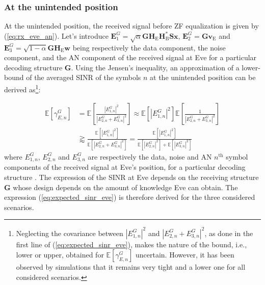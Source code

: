 \documentclass[journal,comsoc]{IEEEtran}
\newcommand{\EX}[1]{\mathbb{E} \left[#1\right]}%
\newcommand{\HE}{\textbf{H}_{\text{E}}}
\newcommand{\HB}{\textbf{H}_{\text{B}}}
\newcommand{\spread}{\textbf{S}}
\newcommand{\w}{\textbf{w}}
\newcommand{\mat}[1]{\boldsymbol{\mathrm{#1}}}
\begin{document}
\subsubsection{At the unintended position}
At the unintended position, the received signal before ZF equalization is given by (\ref{eq:rx_eve_an}). Let's introduce $\textbf{E}_1^G = \sqrt{\alpha}  \textbf{G} \HE \HB^* \spread\textbf{x} $, $\textbf{E}_2^G = \textbf{G}  \textbf{v}_\text{E}$ and $\textbf{E}_3^G = \sqrt{1-\alpha} \textbf{G} \HE \w$ being respectively the data component, the noise component, and the AN component of the received signal at Eve  for a particular decoding structure $\textbf{G}$. Using the Jensen's inequality, an approximation of a lower-bound of the averaged SINR of the symbols $n$ at the unintended position can be derived as\footnote{Neglecting the covariance between $\left|E_{1,n}^G\right|^2$ and $\left| E_{2,n}^G + E_{3,n}^G \right|^2$, as  done in the first line of (\ref{eq:expected_sinr_eve}), makes the nature of the bound, i.e., lower or upper, obtained for $\EX{\gamma_{E,n}^G}$ uncertain. However, it has been observed by simulations that it remains very tight and a lower one for all considered scenarios.}:

\begin{equation}
\begin{split}
\EX{\gamma_{E,n}^G} &= \EX{  \frac{ \left| E_{1,n}^G \right|^2  }{ \left| E_{2,n}^G + E_{3,n}^G \right|^2 } }  \approx  \EX{ \left| E_{1,n}^G \right|^2 }  \EX{ \frac{1}{ \left| E_{2,n}^G + E_{3,n}^G \right|^2} }  \\
& \gtrapprox \frac{\EX{   \left| E_{1,n}^G \right|^2  } }{\EX{ \left| E_{2,n}^G + E_{3,n}^G \right|^2  }} =  \frac{\EX{  \left| E_{1,n}^G \right|^2  } }{\EX{  \left| E_{2,n}^G \right|^2  } +  \EX{  \left|E_{3,n}^G \right|^2  }}
\label{eq:expected_sinr_eve}
\end{split}
\end{equation}
where $E_{1,n}^G$, $E_{2,n}^G$ and $E_{3,n}^G$ are respectively the data, noise and AN $n^{\text{th}}$ symbol components of the received signal at Eve's position, for a particular decoding structure \mat{G}. The expression of the SINR at Eve depends on the receiving structure $\textbf{G}$ whose design depends on the amount of knowledge Eve can obtain. The expression (\ref{eq:expected_sinr_eve}) is therefore derived for  the three considered scenarios.
\end{document}

